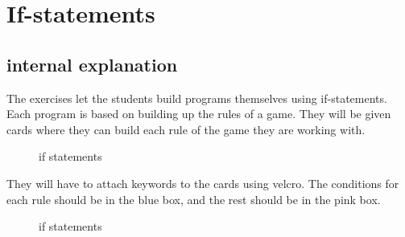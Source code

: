 \section{If-statements}

\subsection*{internal explanation}

The exercises let the students build programs themselves using if-statements. Each program is based on building up the rules of a game. They will be given cards where they can build each rule of the game they are working with. 

\begin{figure}[H]
    \caption{if statements}
\end{figure}

They will have to attach keywords to the cards using velcro. The conditions for each rule should be in the blue box, and the rest should be in the pink box. 


\begin{figure}[H]
    \caption{if statements}
\end{figure}


